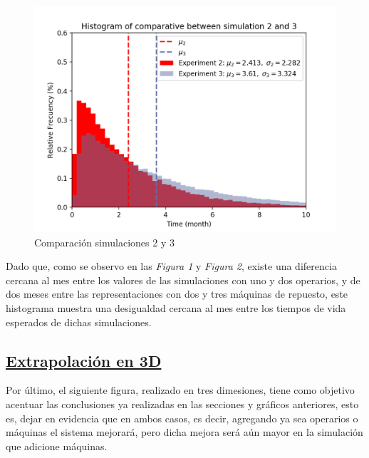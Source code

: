     \begin{figure}[H]
      \includegraphics[scale=1.1]{graphics/Comparative_graphic_3.png}
      \caption{Comparación simulaciones 2 y 3}
      \centering
    \end{figure}

    \par Dado que, como se observo en las \textit{Figura 1} y \textit{Figura 2}, existe una diferencia cercana al mes
    entre los valores de las simulaciones con uno y dos operarios, y de dos meses entre las representaciones con dos y
    tres máquinas de repuesto, este histograma muestra una desigualdad cercana al mes entre los tiempos de vida
    esperados de dichas simulaciones.

  \pagebreak
  \subsection{\underline{Extrapolación en 3D}}

    \par Por último, el siguiente figura, realizado en tres dimesiones, tiene como objetivo acentuar las conclusiones
    ya realizadas en las secciones y gráficos anteriores, esto es, dejar en evidencia que en ambos casos, es decir,
    agregando ya sea operarios o máquinas el sistema mejorará, pero dicha mejora será aún mayor en la simulación que
    adicione máquinas.

